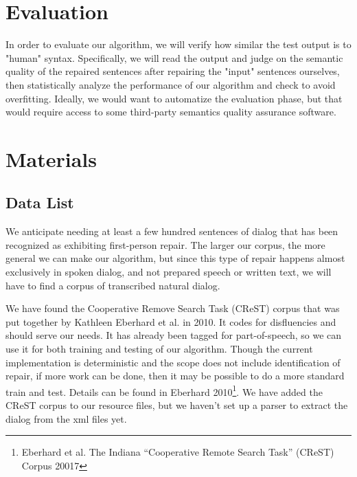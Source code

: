 \documentclass{article}
\begin{document}
\section{Evaluation}

\begin{flushleft}

In order to evaluate our algorithm, we will verify how similar the test output is to "human" syntax. Specifically, we will read the output and judge on the semantic quality of the repaired sentences after repairing the "input" sentences ourselves, then statistically analyze the performance of our algorithm and check to avoid overfitting. Ideally, we would want to automatize the evaluation phase, but that would require access to some third-party semantics quality assurance software.

\end{flushleft}


\section{Materials}
\subsection{Data List}

\begin{flushleft}

We anticipate needing at least a few hundred sentences of dialog that has been recognized as exhibiting first-person repair. The larger our corpus, the more general we can make our algorithm, but since this type of repair happens almost exclusively in spoken dialog, and not prepared speech or written text, we will have to find a corpus of transcribed natural dialog.

\end{flushleft}

\begin{flushleft}

  We have found the Cooperative Remove Search Task (CReST) corpus that was put together by Kathleen Eberhard et al. in 2010. It codes for disfluencies and should serve our needs. It has already been tagged for part-of-speech, so we can use it for both training and testing of our algorithm. Though the current implementation is deterministic and the scope does not include identification of repair, if more work can be done, then it may be possible to do a more standard train and test. Details can be found in Eberhard 2010\footnote{Eberhard et al. The Indiana ``Cooperative Remote Search Task'' (CReST) Corpus 20017}. We have added the CReST corpus to our resource files, but we haven't set up a parser to extract the dialog from the xml files yet.

\end{flushleft}
\end{document}
